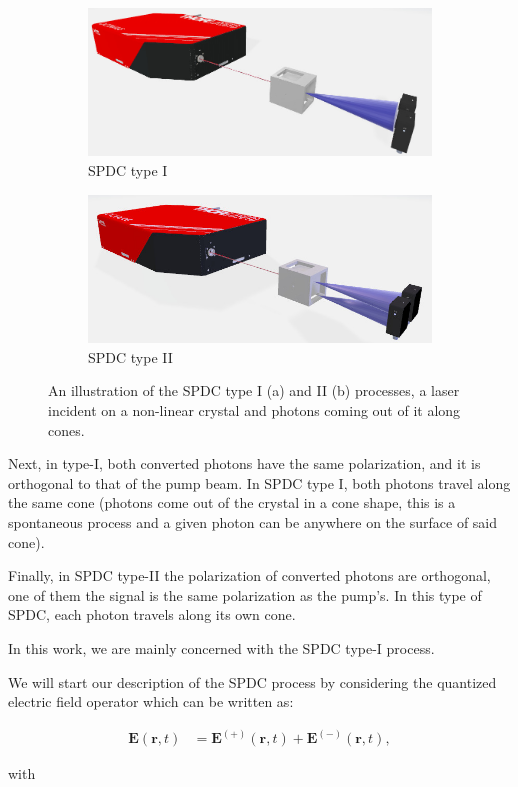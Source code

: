 \documentclass[12pt]{book}
\begin{document}
\begin{figure}[h!]
\centering
\begin{subfigure}[b]{0.45\linewidth}
\includegraphics[width=\linewidth,height=2.8 cm]{images/TypeI.jpg}
\caption{SPDC type I}
\label{fig:type1}
\end{subfigure}
\begin{subfigure}[b]{0.45\linewidth}
\includegraphics[width=\linewidth,height=2.8 cm]{images/typeII.jpg}
\caption{SPDC type II}
\label{fig:type2}
\end{subfigure}
\caption{An illustration of the SPDC type I (a) and II (b) processes, a laser incident on a non-linear crystal and photons coming out of it along cones.}
\label{fig:SPDC}
\end{figure}

Next, in type-I, both converted photons have the same polarization, and it is orthogonal to that of the pump beam. In SPDC type I, both photons travel along the same cone (photons come out of the crystal in a cone shape, this is a spontaneous process and a given photon can be anywhere on the surface of said cone).

Finally, in SPDC type-II the polarization of converted photons are orthogonal, one of them the signal is the same polarization as the pump's. In this type of SPDC, each photon travels along its own cone.

In this work, we are mainly concerned with the SPDC type-I process.

We will start our description of the SPDC process by considering the quantized electric field operator which can be written as:

\begin{align}
\textbf{E}(\textbf{r},t)&=\textbf{E}^{(+)} (\textbf{r},t) + \textbf{E}^{(-)} (\textbf{r},t), \label{fiel+}
\end{align}

with
\end{document}
